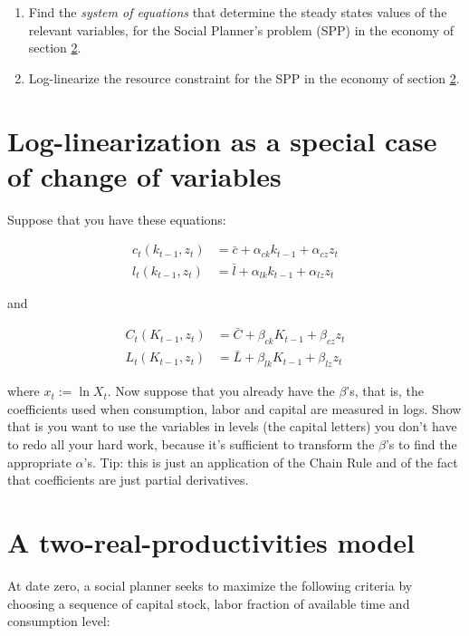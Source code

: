 \documentclass[11pt]{article}
\begin{document}
\begin{enumerate}
\item Find the \emph{system of equations} that determine the steady states values of the relevant variables, for the Social Planner's problem (SPP) in the economy of section \ref{sec:two-prod-model}.
\item Log-linearize the resource constraint for the SPP in the economy of section \ref{sec:two-prod-model}. 
\end{enumerate}

\section{Log-linearization as a special case of change of variables}

Suppose that you have these equations:

\begin{align}
c_t(k_{t-1}, z_t) & = \bar{c} + \alpha_{ck} k_{t-1} + \alpha_{cz} z_t \\
l_t(k_{t-1}, z_t) & = \bar{l} + \alpha_{lk} k_{t-1} + \alpha_{lz} z_t
\end{align}

and

\begin{align}
C_t(K_{t-1}, z_t) & = \bar{C} + \beta_{ck} K_{t-1} + \beta_{cz} z_t \\
L_t(K_{t-1}, z_t) & = \bar{L} + \beta_{lk} K_{t-1} + \beta_{lz} z_t
\end{align}

where $x_t := \ln X_t$. Now suppose that you already have the $\beta$'s, that is, the coefficients used when consumption, labor and capital are measured in logs. Show that is you want to use the variables in levels (the capital letters) you don't have to redo all your hard work, because it's sufficient to transform the $\beta$'s to find the appropriate $\alpha$'s. Tip: this is just an application of the Chain Rule and of the fact that coefficients are just partial derivatives.


\section{A two-real-productivities  model}\label{sec:two-prod-model}

At date zero, a social planner seeks to maximize the following criteria  by choosing a sequence of capital stock, labor fraction of available time and consumption level: 
\end{document}
